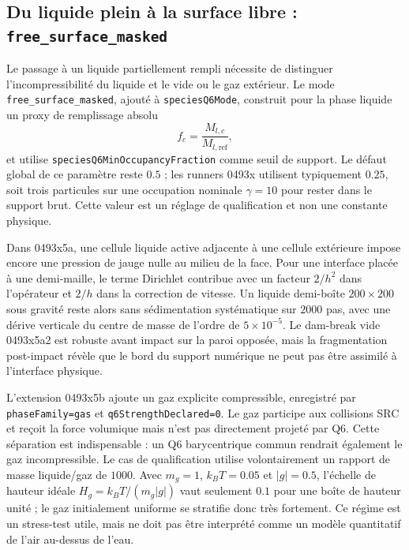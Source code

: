 \documentclass[11pt,a4paper]{article}
\begin{document}
\subsection{Du liquide plein à la surface libre : \texttt{free\_surface\_masked}}

Le passage à un liquide partiellement rempli nécessite de distinguer l'incompressibilité du liquide et le vide ou le gaz extérieur. Le mode \texttt{free\_surface\_masked}, ajouté à \texttt{speciesQ6Mode}, construit pour la phase liquide un proxy de remplissage absolu
\begin{equation}
  f_c=\frac{M_{l,c}}{M_{l,\mathrm{ref}}},
\end{equation}
et utilise \texttt{speciesQ6MinOccupancyFraction} comme seuil de support. Le défaut global de ce paramètre reste $0.5$ ; les runners 0493x utilisent typiquement $0.25$, soit trois particules sur une occupation nominale $\gamma=10$ pour rester dans le support brut. Cette valeur est un réglage de qualification et non une constante physique.

Dans 0493x5a, une cellule liquide active adjacente à une cellule extérieure impose encore une pression de jauge nulle au milieu de la face. Pour une interface placée à une demi-maille, le terme Dirichlet contribue avec un facteur $2/h^2$ dans l'opérateur et $2/h$ dans la correction de vitesse. Un liquide demi-boîte $200\times200$ sous gravité reste alors sans sédimentation systématique sur $2000$ pas, avec une dérive verticale du centre de masse de l'ordre de $5\times10^{-5}$. Le dam-break vide 0493x5a2 est robuste avant impact sur la paroi opposée, mais la fragmentation post-impact révèle que le bord du support numérique ne peut pas être assimilé à l'interface physique.

L'extension 0493x5b ajoute un gaz explicite compressible, enregistré par \texttt{phaseFamily=gas} et \texttt{q6StrengthDeclared=0}. Le gaz participe aux collisions SRC et reçoit la force volumique mais n'est pas directement projeté par Q6. Cette séparation est indispensable : un Q6 barycentrique commun rendrait également le gaz incompressible. Le cas de qualification utilise volontairement un rapport de masse liquide/gaz de $1000$. Avec $m_g=1$, $k_BT=0.05$ et $|g|=0.5$, l'échelle de hauteur idéale $H_g=k_BT/(m_g|g|)$ vaut seulement $0.1$ pour une boîte de hauteur unité ; le gaz initialement uniforme se stratifie donc très fortement. Ce régime est un stress-test utile, mais ne doit pas être interprété comme un modèle quantitatif de l'air au-dessus de l'eau.
\end{document}
